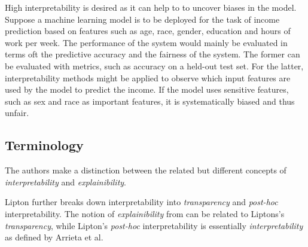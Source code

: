 




High interpretability is desired as it can help to to uncover biases in the model. Suppose a machine learning model is to be deployed for the task of income prediction based on features such as age, race, gender, education and hours of work per week. The performance of the system would mainly be evaluated in terms oft the predictive accuracy and the fairness of the system. The former can be evaluated with metrics, such as accuracy on a held-out test set. For the latter, interpretability methods might be applied to observe which input features are used by the model to predict the income. 
If the model uses sensitive features, such as sex and race as important features, it is systematically biased and thus unfair. 


\subsection{Terminology}
\label{subsec:interpretation_methods_terminology}

The authors make a distinction between the related but different concepts of \textit{interpretability} and \textit{explainibility}. 

Lipton \cite{lipton2018mythos} further breaks down interpretability into \textit{transparency} and \textit{post-hoc} interpretability. The notion of \textit{explainibility} from \cite{arrieta2020explainable} can be related to Liptons's \textit{transparency}, while Lipton's \textit{post-hoc} interpretability is essentially \textit{interpretability} as defined by Arrieta et al. 


